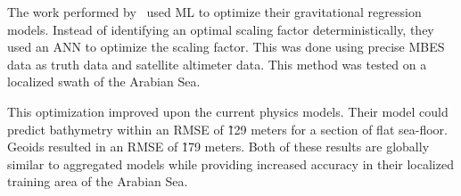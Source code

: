 \par
The work performed by~\cite{jena2012prediction} used \ac{ML} to optimize their gravitational regression models.
Instead of identifying an optimal scaling factor deterministically, they used an \ac{ANN} to optimize the scaling factor.
This was done using precise \ac{MBES} data as truth data and satellite altimeter data.
This method was tested on a localized swath of the Arabian Sea.

\par
This optimization improved upon the current physics models.
Their model could predict bathymetry within an \ac{RMSE} of \~129 meters for a section of flat sea-floor.
Geoids resulted in an \ac{RMSE} of \~179 meters.
Both of these results are globally similar to aggregated models while providing increased accuracy in their localized training area of the Arabian Sea.

